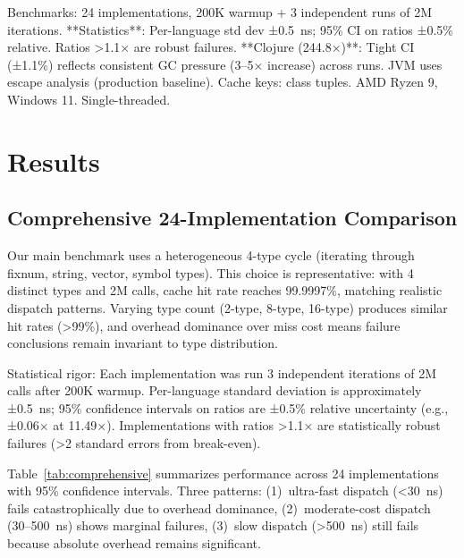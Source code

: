 \documentclass[sigplan,final,acmsmall,review,screen]{acmart}
\begin{document}
Benchmarks: 24 implementations, 200K warmup + 3 independent runs of 2M iterations. **Statistics**: Per-language std dev ±0.5~ns; 95\% CI on ratios ±0.5\% relative. Ratios >1.1× are robust failures. **Clojure (244.8×)**: Tight CI (±1.1\%) reflects consistent GC pressure (3--5× increase) across runs. JVM uses escape analysis (production baseline). Cache keys: class tuples. AMD Ryzen 9, Windows 11. Single-threaded.

\section{Results}

\subsection{Comprehensive 24-Implementation Comparison}

Our main benchmark uses a heterogeneous 4-type cycle (iterating through fixnum, string, vector, symbol types). This choice is representative: with 4 distinct types and 2M calls, cache hit rate reaches 99.9997\%, matching realistic dispatch patterns. Varying type count (2-type, 8-type, 16-type) produces similar hit rates (>99\%), and overhead dominance over miss cost means failure conclusions remain invariant to type distribution.

Statistical rigor: Each implementation was run 3 independent iterations of 2M calls after 200K warmup. Per-language standard deviation is approximately ±0.5~ns; 95\% confidence intervals on ratios are ±0.5\% relative uncertainty (e.g., ±0.06× at 11.49×). Implementations with ratios >1.1× are statistically robust failures (>2 standard errors from break-even).

Table~\ref{tab:comprehensive} summarizes performance across 24 implementations with 95\% confidence intervals. Three patterns: (1)~ultra-fast dispatch (<30~ns) fails catastrophically due to overhead dominance, (2)~moderate-cost dispatch (30--500~ns) shows marginal failures, (3)~slow dispatch (>500~ns) still fails because absolute overhead remains significant.
\end{document}
